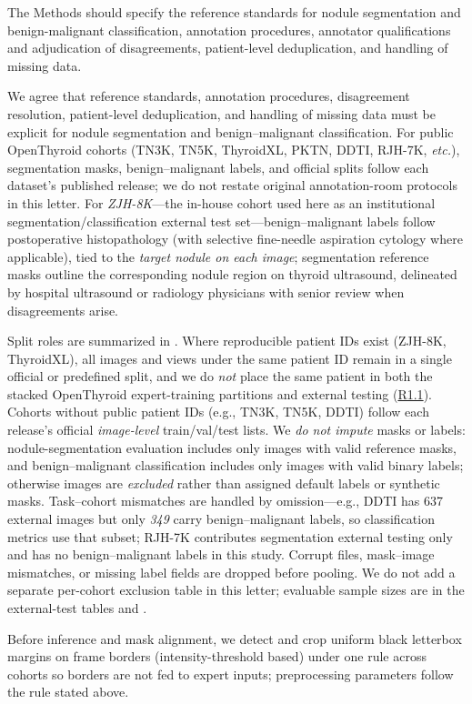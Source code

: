 \label{rev:R2.5}
\begin{reviewercomment}
The Methods should specify the reference standards for nodule segmentation and benign-malignant classification, annotation procedures, annotator qualifications and adjudication of disagreements, patient-level deduplication, and handling of missing data.
\end{reviewercomment}
\begin{authorresponse}
We agree that reference standards, annotation procedures, disagreement resolution, patient-level deduplication, and handling of missing data must be explicit for nodule segmentation and benign--malignant classification. For public OpenThyroid cohorts (TN3K, TN5K, ThyroidXL, PKTN, DDTI, RJH-7K, \textit{etc.}), segmentation masks, benign--malignant labels, and official splits follow each dataset's published release; we do not restate original annotation-room protocols in this letter. For \emph{ZJH-8K}---the in-house cohort used here as an institutional segmentation/classification external test set---benign--malignant labels follow postoperative histopathology (with selective fine-needle aspiration cytology where applicable), tied to the \emph{target nodule on each image}; segmentation reference masks outline the corresponding nodule region on thyroid ultrasound, delineated by hospital ultrasound or radiology physicians with senior review when disagreements arise.\par
Split roles are summarized in . Where reproducible patient IDs exist (ZJH-8K, ThyroidXL), all images and views under the same patient ID remain in a single official or predefined split, and we do \emph{not} place the same patient in both the stacked OpenThyroid expert-training partitions and external testing (\hyperref[rev:R1.1]{R1.1}). Cohorts without public patient IDs (e.g., TN3K, TN5K, DDTI) follow each release's official \emph{image-level} train/val/test lists. We \emph{do not impute} masks or labels: nodule-segmentation evaluation includes only images with valid reference masks, and benign--malignant classification includes only images with valid binary labels; otherwise images are \emph{excluded} rather than assigned default labels or synthetic masks. Task--cohort mismatches are handled by omission---e.g., DDTI has 637 external images but only \emph{349} carry benign--malignant labels, so classification metrics use that subset; RJH-7K contributes segmentation external testing only and has no benign--malignant labels in this study. Corrupt files, mask--image mismatches, or missing label fields are dropped before pooling. We do not add a separate per-cohort exclusion table in this letter; evaluable sample sizes are in the external-test tables and .\par
Before inference and mask alignment, we detect and crop uniform black letterbox margins on frame borders (intensity-threshold based) under one rule across cohorts so borders are not fed to expert inputs; preprocessing parameters follow the rule stated above.\par
\par
\end{authorresponse}

